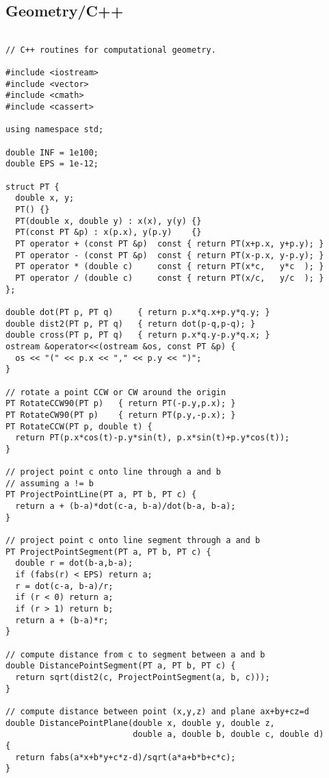 \subsection{Geometry/C++}

\begin{lstlisting}

// C++ routines for computational geometry.

#include <iostream>
#include <vector>
#include <cmath>
#include <cassert>

using namespace std;

double INF = 1e100;
double EPS = 1e-12;

struct PT { 
  double x, y; 
  PT() {}
  PT(double x, double y) : x(x), y(y) {}
  PT(const PT &p) : x(p.x), y(p.y)    {}
  PT operator + (const PT &p)  const { return PT(x+p.x, y+p.y); }
  PT operator - (const PT &p)  const { return PT(x-p.x, y-p.y); }
  PT operator * (double c)     const { return PT(x*c,   y*c  ); }
  PT operator / (double c)     const { return PT(x/c,   y/c  ); }
};

double dot(PT p, PT q)     { return p.x*q.x+p.y*q.y; }
double dist2(PT p, PT q)   { return dot(p-q,p-q); }
double cross(PT p, PT q)   { return p.x*q.y-p.y*q.x; }
ostream &operator<<(ostream &os, const PT &p) {
  os << "(" << p.x << "," << p.y << ")"; 
}

// rotate a point CCW or CW around the origin
PT RotateCCW90(PT p)   { return PT(-p.y,p.x); }
PT RotateCW90(PT p)    { return PT(p.y,-p.x); }
PT RotateCCW(PT p, double t) { 
  return PT(p.x*cos(t)-p.y*sin(t), p.x*sin(t)+p.y*cos(t)); 
}

// project point c onto line through a and b
// assuming a != b
PT ProjectPointLine(PT a, PT b, PT c) {
  return a + (b-a)*dot(c-a, b-a)/dot(b-a, b-a);
}

// project point c onto line segment through a and b
PT ProjectPointSegment(PT a, PT b, PT c) {
  double r = dot(b-a,b-a);
  if (fabs(r) < EPS) return a;
  r = dot(c-a, b-a)/r;
  if (r < 0) return a;
  if (r > 1) return b;
  return a + (b-a)*r;
}

// compute distance from c to segment between a and b
double DistancePointSegment(PT a, PT b, PT c) {
  return sqrt(dist2(c, ProjectPointSegment(a, b, c)));
}

// compute distance between point (x,y,z) and plane ax+by+cz=d
double DistancePointPlane(double x, double y, double z,
                          double a, double b, double c, double d)
{
  return fabs(a*x+b*y+c*z-d)/sqrt(a*a+b*b+c*c);
}


\end{lstlisting}
